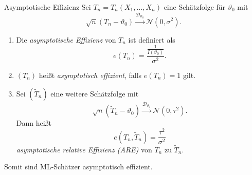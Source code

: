 \begin{karte}{Asymptotische Effizienz}
    Sei \(T_n = T_n(X_1, \ldots, X_n)\) eine Schätzfolge für \( \vartheta_0 \) mit 
    \[ \sqrt{n}(T_n - \vartheta_0) \overset{\mathcal{D}_{\vartheta_0}}{\rightarrow} \mathcal{N}(0, \sigma^2). \]
    \begin{enumerate}
        \item Die \textit{asymptotische Effizienz} von \(T_n\) ist definiert als 
        \[ e(T_n) = \frac{\frac{1}{I(\vartheta_0)}}{\sigma^2}. \]
        \item \((T_n)\) heißt \textit{asymptotisch effizient}, falls \(e(T_n) = 1\) gilt.
        \item Sei \((\tilde{T}_n)\) eine weitere Schätzfolge mit 
        \[ \sqrt{n} (\tilde{T}_n - \vartheta_0) \overset{\mathcal{D}_{\vartheta_0}}{\rightarrow} \mathcal{N}(0, \tau^2). \]
        Dann heißt 
        \[ e(T_n, \tilde{T}_n) = \frac{\tau^2}{\sigma^2} \]
        \textit{asymptotische relative Effizienz (ARE)} von \(T_n\) zu \(\tilde{T}_n\).
    \end{enumerate}
    Somit sind ML-Schätzer asymptotisch effizient.
\end{karte}

